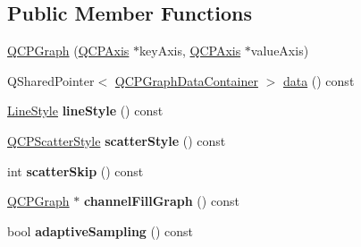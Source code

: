 \subsection*{Public Member Functions}
\begin{DoxyCompactItemize}
\item 
\hyperlink{class_q_c_p_graph_a0393a38cf7183cbf46348eb6cf9a5a6c}{Q\+C\+P\+Graph} (\hyperlink{class_q_c_p_axis}{Q\+C\+P\+Axis} $\ast$key\+Axis, \hyperlink{class_q_c_p_axis}{Q\+C\+P\+Axis} $\ast$value\+Axis)
\item 
Q\+Shared\+Pointer$<$ \hyperlink{class_q_c_p_data_container}{Q\+C\+P\+Graph\+Data\+Container} $>$ \hyperlink{class_q_c_p_graph_a04514a2b1fb61a280ead66abe80b89ab}{data} () const 
\item 
\hyperlink{class_q_c_p_graph_ad60175cd9b5cac937c5ee685c32c0859}{Line\+Style} {\bfseries line\+Style} () const \hypertarget{class_q_c_p_graph_ad6db8d31abeac256a285fc68d6b9b9be}{}\label{class_q_c_p_graph_ad6db8d31abeac256a285fc68d6b9b9be}

\item 
\hyperlink{class_q_c_p_scatter_style}{Q\+C\+P\+Scatter\+Style} {\bfseries scatter\+Style} () const \hypertarget{class_q_c_p_graph_ae0227c79f4e42a350c2c99fb2fb879db}{}\label{class_q_c_p_graph_ae0227c79f4e42a350c2c99fb2fb879db}

\item 
int {\bfseries scatter\+Skip} () const \hypertarget{class_q_c_p_graph_ae82c8427471bf68ccae960dfea6f30bd}{}\label{class_q_c_p_graph_ae82c8427471bf68ccae960dfea6f30bd}

\item 
\hyperlink{class_q_c_p_graph}{Q\+C\+P\+Graph} $\ast$ {\bfseries channel\+Fill\+Graph} () const \hypertarget{class_q_c_p_graph_a5369f23863e04a6164f8b66d49fd18f4}{}\label{class_q_c_p_graph_a5369f23863e04a6164f8b66d49fd18f4}

\item 
bool {\bfseries adaptive\+Sampling} () const \hypertarget{class_q_c_p_graph_ad3bea28ec910eedfa9b788928d610de0}{}\label{class_q_c_p_graph_ad3bea28ec910eedfa9b788928d610de0}


\end{DoxyCompactItemize}
